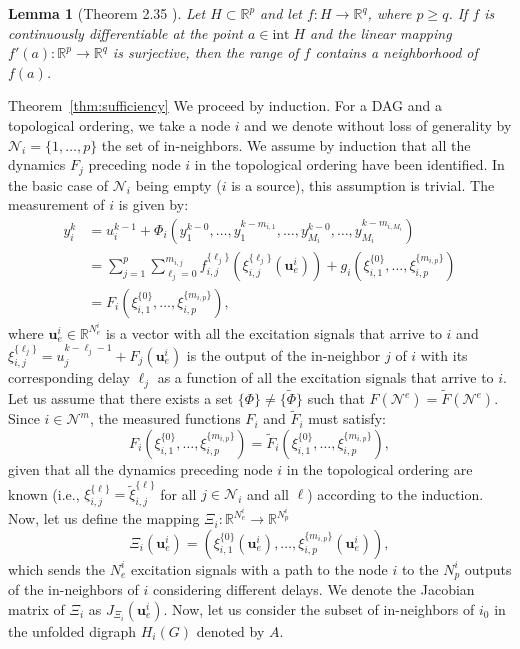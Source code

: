 \documentclass[letterpaper,10pt,journal]{IEEEtran}
\newcommand{\uu}{\mathbf{u}}
\newtheorem{lemma}{Lemma}
\newcommand{\R}{\mathbb R}
\newcommand{\NN}{\mathcal{N}}
\begin{document}
\begin{lemma}[Theorem 2.35 \cite{laczkovich2017real}]\label{lemma:mapping}
    Let $H\subset \R^p$ and let $f:H\to\R^q$, where $p\ge q$. If $f$ is continuously differentiable at the point $a\in \text{int} \;H$ and the linear mapping $f'(a):\R^p\to\R^q$ is surjective, then the range of $f$ contains a neighborhood of $f(a)$.
\end{lemma}
\begin{myproof}{Theorem~\ref{thm:sufficiency}}
We proceed by induction. For a DAG and a topological ordering, we take a node $i$ and we denote without loss of generality by $\NN_i=\{1,\ldots,p\}$ the set of in-neighbors. We assume by induction that all the dynamics $F_j$ preceding node $i$ in the topological ordering have been identified. In the basic case of $\NN_i$ being empty ($i$ is a source), this assumption is trivial.
The measurement of $i$ is given by:
\begin{align*}
    y_i^k&=u_i^{k-1}+\Phi_i(y_1^{k-0},\ldots,y_1^{k-m_{i,1}},\ldots,y_{M_i}^{k-0},\ldots,y_{M_i}^{k-m_{i,M_i}})\\
    &=\sum_{j=1}^p\sum_{\ell_j=0}^{m_{i,j}} f_{i,j}^{\{\ell_j\}}(\xi_{i,j}^{\{\ell_j\}}(\uu_e^i))+g_i(\xi_{i,1}^{\{0\}},\ldots,\xi_{i,p}^{\{m_{i,p}\}})\\
    &=F_i(\xi_{i,1}^{\{0\}},\ldots,\xi_{i,p}^{\{m_{i,p}\}}),
\end{align*} 
where $\uu_e^i\in \R^{N_e^i}$ is a vector with all the excitation signals that arrive to $i$ and $\xi_{i,j}^{\{\ell_j\}}=u_j^{k-\ell_j-1}\!+\!F_j(\uu_e^i)$ is the output of the in-neighbor $j$ of $i$ with its corresponding delay $\ell_j$ as a function of all the excitation signals that arrive to $i$.
    Let us assume that there exists a set $\{ \Phi \}\neq \{ \tilde \Phi \}$ such that $F(\NN^e)=\tilde F(\NN^e)$. Since $i\in \NN^m$, the measured functions $F_i$ and $\tilde F_i$ must satisfy:
\begin{equation}\label{eq:identifiability_problem}
    F_i(\xi_{i,1}^{\{0\}},\ldots,\xi_{i,p}^{\{m_{i,p}\}})=\tilde F_i(\xi_{i,1}^{\{0\}},\ldots,\xi_{i,p}^{\{m_{i,p}\}}),
\end{equation}
given that all the dynamics preceding node $i$ in the topological ordering are known (i.e., $\xi_{i,j}^{\{\ell\}}=\tilde \xi_{i,j}^{\{\ell\}}$ for all $j\in \NN_i$ and all $\ell$) according to the induction.
Now, let us define the mapping $\Xi_i:\R^{N_e^i}\to\R^{N_p^i}$ 
$$
\Xi_i(\uu_e^i)\!=\!(\xi_{i,1}^{\{0\}}(\uu_e^i),\ldots,\xi_{i,p}^{\{m_{i,p}\}}(\uu_e^i)),
$$
which sends the $N_e^i$ excitation signals with a path to the node $i$ to the $N_p^i$ outputs of the in-neighbors of $i$ considering different delays. We denote the Jacobian matrix of $\Xi_i$ as $J_{\Xi_i}(\uu_e^i)$. Now, let us consider the subset of in-neighbors of $i_0$ in the unfolded digraph $H_i(G)$ denoted by $A$.

\end{myproof}
\end{document}
